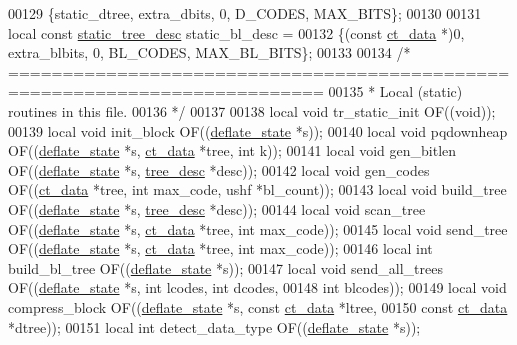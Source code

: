 \begin{DoxyCode}
00129 \{static\_dtree, extra\_dbits, 0,          D\_CODES, MAX\_BITS\};
00130 
00131 local \textcolor{keyword}{const} \hyperlink{structstatic__tree__desc__s}{static\_tree\_desc}  static\_bl\_desc =
00132 \{(\textcolor{keyword}{const} \hyperlink{structct__data__s}{ct\_data} *)0, extra\_blbits, 0,   BL\_CODES, MAX\_BL\_BITS\};
00133 
00134 \textcolor{comment}{/* ===========================================================================}
00135 \textcolor{comment}{ * Local (static) routines in this file.}
00136 \textcolor{comment}{ */}
00137 
00138 local \textcolor{keywordtype}{void} tr\_static\_init OF((\textcolor{keywordtype}{void}));
00139 local \textcolor{keywordtype}{void} init\_block     OF((\hyperlink{structinternal__state}{deflate\_state} *s));
00140 local \textcolor{keywordtype}{void} pqdownheap     OF((\hyperlink{structinternal__state}{deflate\_state} *s, \hyperlink{structct__data__s}{ct\_data} *tree, \textcolor{keywordtype}{int} k));
00141 local \textcolor{keywordtype}{void} gen\_bitlen     OF((\hyperlink{structinternal__state}{deflate\_state} *s, \hyperlink{structtree__desc__s}{tree\_desc} *desc));
00142 local \textcolor{keywordtype}{void} gen\_codes      OF((\hyperlink{structct__data__s}{ct\_data} *tree, \textcolor{keywordtype}{int} max\_code, ushf *bl\_count));
00143 local \textcolor{keywordtype}{void} build\_tree     OF((\hyperlink{structinternal__state}{deflate\_state} *s, \hyperlink{structtree__desc__s}{tree\_desc} *desc));
00144 local \textcolor{keywordtype}{void} scan\_tree      OF((\hyperlink{structinternal__state}{deflate\_state} *s, \hyperlink{structct__data__s}{ct\_data} *tree, \textcolor{keywordtype}{int} max\_code));
00145 local \textcolor{keywordtype}{void} send\_tree      OF((\hyperlink{structinternal__state}{deflate\_state} *s, \hyperlink{structct__data__s}{ct\_data} *tree, \textcolor{keywordtype}{int} max\_code));
00146 local \textcolor{keywordtype}{int}  build\_bl\_tree  OF((\hyperlink{structinternal__state}{deflate\_state} *s));
00147 local \textcolor{keywordtype}{void} send\_all\_trees OF((\hyperlink{structinternal__state}{deflate\_state} *s, \textcolor{keywordtype}{int} lcodes, \textcolor{keywordtype}{int} dcodes,
00148                               \textcolor{keywordtype}{int} blcodes));
00149 local \textcolor{keywordtype}{void} compress\_block OF((\hyperlink{structinternal__state}{deflate\_state} *s, \textcolor{keyword}{const} \hyperlink{structct__data__s}{ct\_data} *ltree,
00150                               \textcolor{keyword}{const} \hyperlink{structct__data__s}{ct\_data} *dtree));
00151 local \textcolor{keywordtype}{int}  detect\_data\_type OF((\hyperlink{structinternal__state}{deflate\_state} *s));

\end{DoxyCode}
